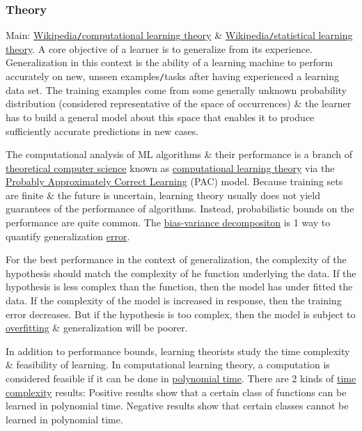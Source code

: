 \documentclass{article}
\begin{document}
\subsubsection{Theory}
Main: \href{https://en.wikipedia.org/wiki/Computational_learning_theory}{Wikipedia{\tt/}computational learning theory} \& \href{https://en.wikipedia.org/wiki/Statistical_learning_theory}{Wikipedia{\tt/}statistical learning theory}. A core objective of a learner is to generalize from its experience. Generalization in this context is the ability of a learning machine to perform accurately on new, unseen examples{\tt/}tasks after having experienced a learning data set. The training examples come from some generally unknown probability distribution (considered representative of the space of occurrences) \& the learner has to build a general model about this space that enables it to produce sufficiently accurate predictions in new cases.

The computational analysis of ML algorithms \& their performance is a branch of \href{https://en.wikipedia.org/wiki/Theoretical_computer_science}{theoretical computer science} known as \href{https://en.wikipedia.org/wiki/Computational_learning_theory}{computational learning theory} via the \href{https://en.wikipedia.org/wiki/Probably_approximately_correct_learning}{Probably Approximately Correct Learning} (PAC) model. Because training sets are finite \& the future is uncertain, learning theory usually does not yield guarantees of the performance of algorithms. Instead, probabilistic bounds on the performance are quite common. The \href{https://en.wikipedia.org/wiki/Bias%E2%80%93variance_decomposition}{bias-variance decompositon} is 1 way to quantify generalization \href{https://en.wikipedia.org/wiki/Errors_and_residuals}{error}.

For the best performance in the context of generalization, the complexity of the hypothesis should match the complexity of he function underlying the data. If the hypothesis is less complex than the function, then the model has under fitted the data. If the complexity of the model is increased in response, then the training error decreases. But if the hypothesis is too complex, then the model is subject to \href{https://en.wikipedia.org/wiki/Overfitting}{overfitting} \& generalization will be poorer.

In addition to performance bounds, learning theorists study the time complexity \& feasibility of learning. In computational learning theory, a computation is considered feasible if it can be done in \href{https://en.wikipedia.org/wiki/Time_complexity#Polynomial_time}{polynomial time}. There are 2 kinds of \href{https://en.wikipedia.org/wiki/Time_complexity}{time complexity} results: Positive results show that a certain class of functions can be learned in polynomial time. Negative results show that certain classes cannot be learned in polynomial time. 
\end{document}
